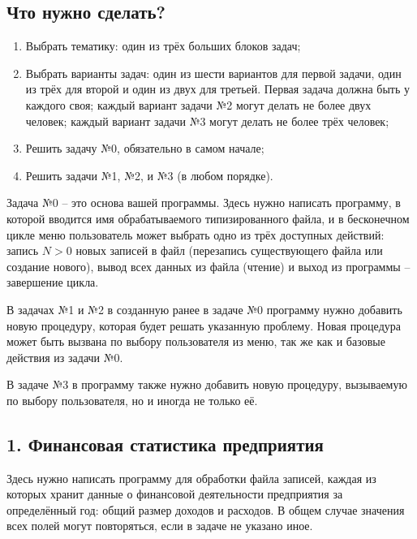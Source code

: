\documentclass[12pt,a4paper]{report}
\begin{document}
\parindent=1cm
\pagestyle{empty}

\lstset{ language=Pascal, basicstyle=\small\ttfamily, numbers=left, numberstyle=\tiny, stepnumber=1, numbersep=5pt, extendedchars=\true, showstringspaces=false, breakatwhitespace=true, frame=single, keepspaces=true }

\clearpage
\subsection*{Что нужно сделать?}
\begin{enumerate}
\item Выбрать тематику: один из трёх больших блоков задач;
\item Выбрать варианты задач: один из шести вариантов для первой задачи, один из трёх для второй и один из двух для третьей. Первая задача должна быть у каждого своя; каждый вариант задачи №2 могут делать не более двух человек; каждый вариант задачи №3 могут делать не более трёх человек;
\item Решить задачу №0, обязательно в самом начале;
\item Решить задачи №1, №2, и №3 (в любом порядке).
\end{enumerate}

Задача №0 -- это основа вашей программы. Здесь нужно написать программу, в которой вводится имя обрабатываемого типизированного файла, и в бесконечном цикле меню пользователь может выбрать одно из трёх доступных действий: запись $N>0$ новых записей в файл (перезапись существующего файла или создание нового), вывод всех данных из файла (чтение) и выход из программы -- завершение цикла.

В задачах №1 и №2 в созданную ранее в задаче №0 программу нужно добавить новую процедуру, которая будет решать указанную проблему. Новая процедура может быть вызвана по выбору пользователя из меню, так же как и базовые действия из задачи №0.

В задаче №3 в программу также нужно добавить новую процедуру, вызываемую по выбору пользователя, но и иногда не только её.


\subsection*{1. Финансовая статистика предприятия}
Здесь нужно написать программу для обработки файла записей, каждая из которых хранит данные о финансовой деятельности предприятия за определённый год: общий размер доходов и расходов. В общем случае значения всех полей могут повторяться, если в задаче не указано иное.
\end{document}
